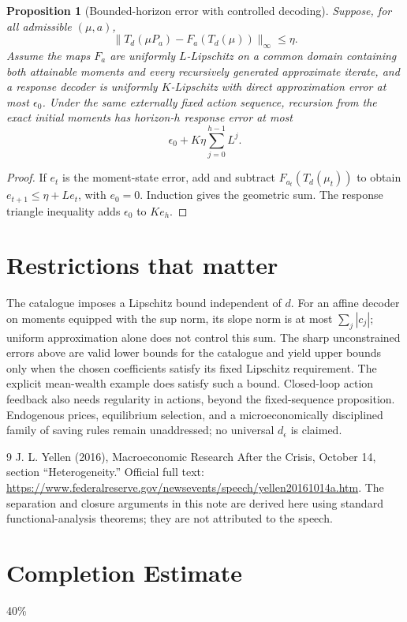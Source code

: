 \documentclass[11pt]{article}
\newtheorem{proposition}{Proposition}
\theoremstyle{definition}
\begin{document}
\begin{proposition}[Bounded-horizon error with controlled decoding]
Suppose, for all admissible $(\mu,a)$,
\[
 \|T_d(\mu P_a)-F_a(T_d(\mu))\|_\infty\leq\eta.
\]
Assume the maps $F_a$ are uniformly $L$-Lipschitz on a common domain containing both attainable moments and every recursively generated approximate iterate, and a response decoder is uniformly $K$-Lipschitz with direct approximation error at most $\epsilon_0$. Under the same externally fixed action sequence, recursion from the exact initial moments has horizon-$h$ response error at most
\[
 \epsilon_0+K\eta\sum_{j=0}^{h-1}L^j.
\]
\end{proposition}
\begin{proof}
If $e_t$ is the moment-state error, add and subtract $F_{a_t}(T_d(\mu_t))$ to obtain $e_{t+1}\leq\eta+Le_t$, with $e_0=0$. Induction gives the geometric sum. The response triangle inequality adds $\epsilon_0$ to $K e_h$.
\end{proof}

\section*{Restrictions that matter}
The catalogue imposes a Lipschitz bound independent of $d$. For an affine decoder on moments equipped with the sup norm, its slope norm is at most $\sum_j|c_j|$; uniform approximation alone does not control this sum. The sharp unconstrained errors above are valid lower bounds for the catalogue and yield upper bounds only when the chosen coefficients satisfy its fixed Lipschitz requirement. The explicit mean-wealth example does satisfy such a bound. Closed-loop action feedback also needs regularity in actions, beyond the fixed-sequence proposition. Endogenous prices, equilibrium selection, and a microeconomically disciplined family of saving rules remain unaddressed; no universal $d_\epsilon$ is claimed.
\begin{thebibliography}{9}
 J. L. Yellen (2016), Macroeconomic Research After the Crisis, October 14, section ``Heterogeneity.'' Official full text: \url{https://www.federalreserve.gov/newsevents/speech/yellen20161014a.htm}. The separation and closure arguments in this note are derived here using standard functional-analysis theorems; they are not attributed to the speech.
\end{thebibliography}

\section{Completion Estimate}
40\%
\end{document}
